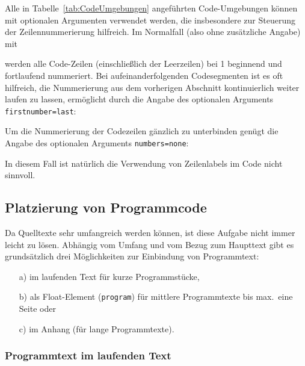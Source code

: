 Alle in Tabelle~\ref{tab:CodeUmgebungen} angeführten Code-Umgebungen können
mit optionalen Argumenten verwendet werden, die insbesondere zur Steuerung
der Zeilennummerierung hilfreich. Im Normalfall (also ohne zusätzliche
Angabe) mit
%
%
werden alle Code-Zeilen (einschließlich der Leerzeilen) bei 1 beginnend und
fortlaufend nummeriert. Bei aufeinanderfolgenden Codesegmenten ist es oft
hilfreich, die Nummerierung aus dem vorherigen Abschnitt kontinuierlich
weiter laufen zu lassen, ermöglicht durch die Angabe des optionalen Arguments
\texttt{firstnumber={\obnh}last}:
%
%
Um die Nummerierung der Codezeilen gänzlich zu unterbinden genügt die Angabe
des optionalen Arguments \texttt{numbers={\obnh}none}:
%
%
In diesem Fall ist natürlich die Verwendung von Zeilenlabels im Code nicht
sinnvoll.


\subsection{Platzierung von Programmcode}

Da Quelltexte sehr umfangreich werden können, ist diese Aufgabe nicht immer
leicht zu lösen. Abhängig vom Umfang und vom Bezug zum Haupttext gibt es
grundsätzlich drei Möglichkeiten zur Einbindung von Programmtext:
%
\begin{itemize}
	\item[a)] im laufenden Text für kurze Programmstücke,
	\item[b)] als Float-Element (\texttt{program}) für mittlere Programmtexte
	bis max.\ eine Seite oder
	\item[c)] im Anhang (für lange Programmtexte).
\end{itemize}

\subsubsection{Programmtext im laufenden Text}

